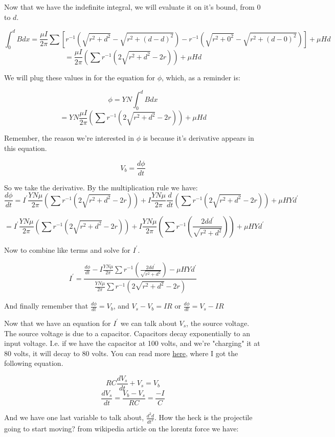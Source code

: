 \documentclass{article}
\begin{document}
Now that we have the indefinite integral, we will evaluate it on it's bound, from $0$ to $d$.

\[ \int_0^d Bdx = \frac{\mu I}{2\pi} \sum \left[r^{-1} ( \sqrt{r^2 + d^2} - \sqrt{r^2 + (d-d)^2}) - r^{-1} ( \sqrt{r^2 + 0^2} - \sqrt{r^2 + (d-0)^2})\right] + \mu Hd \]
\[ = \frac{\mu I}{2\pi} \left(\sum r^{-1}(2\sqrt{r^2 + d^2} - 2r) \right) + \mu Hd\]

We will plug these values in for the equation for $\phi$, which, as a reminder is: 

\[\phi=YN\int_0^d Bdx\]
\[ = YN\frac{\mu I}{2\pi } \left(\sum r^{-1}(2\sqrt{r^2 + d^2} - 2r) \right) + \mu Hd\]

Remember, the reason we're interested in $\phi$ is because it's derivative appears in this equation.

\[V_b=\frac{d\phi}{dt}\]

So we take the derivative. By the multiplication rule we have:
\[ \frac{d\phi}{dt} = I^\prime \frac{YN\mu}{2\pi} \left(\sum r^{-1} (2\sqrt{r^2 + d^2} - 2r) \right) + I \frac{YN\mu}{2\pi} \frac{d}{dt}\left(\sum r^{-1} (2\sqrt{r^2 + d^2} - 2r) \right) + \mu H Y d^\prime \]

\[ = I^\prime \frac{YN\mu}{2\pi} \left(\sum r^{-1} (2\sqrt{r^2 + d^2} - 2r) \right) + I \frac{YN\mu}{2\pi} \left(\sum r^{-1} (\frac{2dd^\prime}{\sqrt{r^2 + d^2}}) \right) + \mu H Y d^\prime \]

Now to combine like terms and solve for $I^\prime$.

\[I^\prime = \frac{  \frac{d\phi}{dt} - I \frac{YN\mu}{2\pi} \sum r^{-1} (\frac{2dd^\prime}{\sqrt{r^2 + d^2}}) - \mu H Y d^\prime }{ \frac{YN\mu}{2\pi} \sum r^{-1} (2\sqrt{r^2 + d^2} - 2r) } \]

And finally remember that $\frac{d\phi}{dt} = V_b$, and $V_s - V_b = IR$  or $\frac{d\phi}{dt} = V_s - IR $

Now that we have an equation for $I^\prime$ we can talk about $V_s$, the source voltage. The source voltage is due to a capacitor. Capacitors decay exponentially to an input voltage. I.e. if we have the capacitor at 100 volts, and we're "charging" it at 80 volts, it will decay to 80 volts. You can read more \href{https://physics.stackexchange.com/questions/800396/discharge-of-a-capacitor-with-variable-backvoltage}{here}, where I got the following equation.

\[RC\frac{dV_s}{dt} + V_s = V_b \]
\[\frac{dV_s}{dt}= \frac{V_b - V_s}{RC} = \frac{-I}{C}\]

And we have one last variable to talk about, $\frac{d^2d}{dt^2}$. How the heck is the projectile going to start moving? from wikipedia article on the lorentz force we have:
\end{document}
